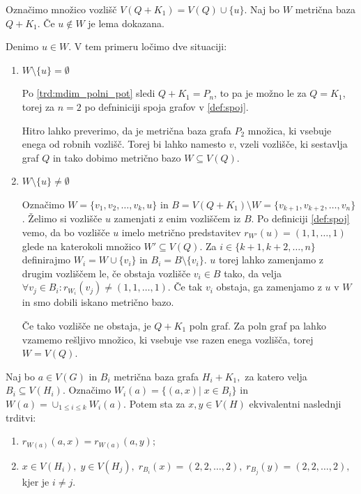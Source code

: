 \documentclass[mat1, tisk]{fmfdelo}
\newcommand{\1}{(1, 1, \ldots, 1)}
\newcommand{\2}{(2, 2, \ldots, 2)}
\begin{document}
\begin{dokaz}
    Označimo množico vozlišč $V(Q + K_1) = V(Q) \cup \{ u \}.$ Naj bo $W$ 
    metrična baza $Q + K_1$. Če $u \notin W$ je lema dokazana. 
    
    Denimo $u \in W.$ 
    V tem primeru ločimo dve situaciji:
    \begin{enumerate}
        \item $W \setminus \{ u \} = \emptyset$     
        
        Po \ref{trd:mdim_polni_pot} sledi $Q + K_1 = P_n$, to pa je možno le za $Q = K_1$, 
        torej za $n = 2$ po defniniciji spoja grafov v \ref{def:spoj}.
     
        Hitro lahko preverimo, da je metrična baza grafa $P_2$ množica, ki vsebuje enega 
        od robnih vozlišč. Torej bi lahko namesto $v$, vzeli vozlišče, ki sestavlja graf 
        $Q$ in tako dobimo metrično bazo $W \subseteq V(Q).$
        
        \item $W \setminus \{ u \} \not = \emptyset$ 
        
        Označimo $W = \{ v_1, v_2, \ldots , v_k, u\}$ in $B = V(Q + K_1) \setminus W = \{ v_{k+1}, v_{k+2}, \ldots, v_n\}$.
        Želimo si vozlišče $u$ zamenjati z enim vozliščem iz $B$. Po definiciji \ref{def:spoj} vemo, da bo vozlišče
        $u$ imelo metrično predstavitev $r_{W'}(u) = \1$ glede na katerokoli množico $W' \subseteq V(Q).$ 
        Za $i \in \{k+1, k+2, \ldots, n\}$ definirajmo $W_i = W \cup \{v_i\}$ in $B_i = B \setminus \{v_i\}.$
        $u$ torej lahko zamenjamo z drugim vozliščem le, če obstaja vozlišče $v_i \in B$ tako,
        da velja $\forall v_j \in B_i : r_{W_i} (v_j) \neq \1.$ Če tak $v_i$ obstaja, ga 
        zamenjamo z $u$ v $W$ in smo dobili iskano metrično bazo. 
        
        Če tako vozlišče ne obstaja, je $Q + K_1$ poln graf. Za poln graf pa lahko vzamemo
        rešljivo množico, ki vsebuje vse razen enega vozlišča, torej $W = V(Q).$
    \end{enumerate}
\end{dokaz}


\begin{lema} \label{lema:3}
    Naj bo $a \in V(G)$ in $B_i$ metrična baza grafa $H_i + K_1,$ za katero velja $B_i \subseteq V(H_i).$
    Označimo $W_i(a) = \{(a,x) | \; x \in B_i\}$ in $W(a) = \cup_{1 \leq i \leq k} W_i(a)$. 
    Potem sta za $x, y \in V(H)$ ekvivalentni naslednji trditvi:
    \begin{enumerate}
        \item $r_{W(a)}(a, x) = r_{W(a)}(a, y);$
        \item $x \in V(H_i), \; y \in V(H_j), \; r_{B_i}(x) = \2, \; r_{B_j}(y) = \2,$ kjer je $i\neq j.$
    \end{enumerate}
\end{lema}
\end{document}
